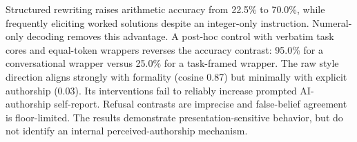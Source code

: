 Structured rewriting raises arithmetic accuracy from 22.5\% to 70.0\%, while frequently eliciting worked solutions despite an integer-only instruction. Numeral-only decoding removes this advantage. A post-hoc control with verbatim task cores and equal-token wrappers reverses the accuracy contrast: 95.0\% for a conversational wrapper versus 25.0\% for a task-framed wrapper. The raw style direction aligns strongly with formality (cosine 0.87) but minimally with explicit authorship (0.03). Its interventions fail to reliably increase prompted AI-authorship self-report. Refusal contrasts are imprecise and false-belief agreement is floor-limited. The results demonstrate presentation-sensitive behavior, but do not identify an internal perceived-authorship mechanism.
